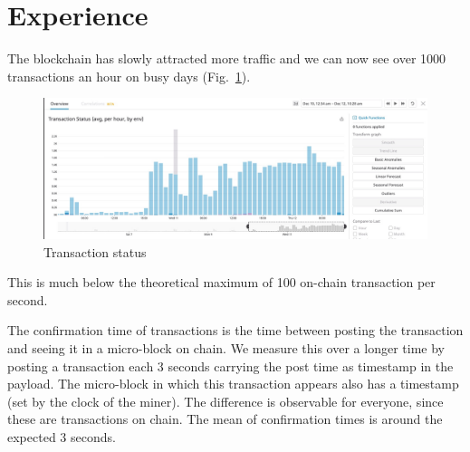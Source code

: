 \section{Experience}
\label{sect:results}



The blockchain has slowly attracted more traffic and we can now see over 1000
transactions an hour on busy days (Fig.\ \ref{txs-nrs}).
\begin{figure}[h]
   \includegraphics[scale=0.23]{TransactionsDec2019.jpg}
   \caption{Transaction status}
   \label{txs-nrs}
\end{figure}
This is much below the theoretical maximum of 100 on-chain transaction per
second.

The confirmation time of transactions is the time between posting the
transaction and seeing it in a micro-block on chain. We measure this over a
longer time by posting a transaction each 3 seconds carrying the post time as
timestamp in the payload. The micro-block in which this transaction appears
also has a timestamp (set by the clock of the miner). The difference is
observable for everyone, since these are transactions on chain. The mean of
confirmation times is around the expected 3 seconds.


